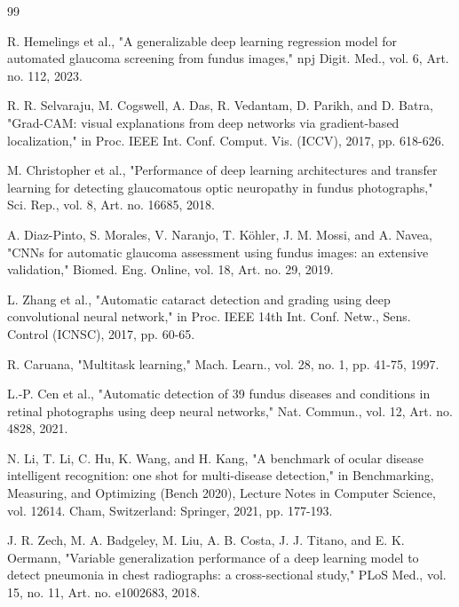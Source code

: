 \documentclass[conference,a4paper]{IEEEtran}
\begin{document}
\begin{thebibliography}{99}

R. Hemelings et al., "A generalizable deep learning regression model for automated glaucoma
screening from fundus images," npj Digit. Med., vol. 6, Art. no. 112, 2023.


R. R. Selvaraju, M. Cogswell, A. Das, R. Vedantam, D. Parikh, and D. Batra, "Grad-CAM: visual
explanations from deep networks via gradient-based localization," in Proc. IEEE Int. Conf. Comput.
Vis. (ICCV), 2017, pp. 618-626.


M. Christopher et al., "Performance of deep learning architectures and transfer learning for
detecting glaucomatous optic neuropathy in fundus photographs," Sci. Rep., vol. 8, Art. no. 16685,
2018.


A. Diaz-Pinto, S. Morales, V. Naranjo, T. Köhler, J. M. Mossi, and A. Navea, "CNNs for automatic
glaucoma assessment using fundus images: an extensive validation," Biomed. Eng. Online, vol. 18,
Art. no. 29, 2019.


L. Zhang et al., "Automatic cataract detection and grading using deep convolutional neural network,"
in Proc. IEEE 14th Int. Conf. Netw., Sens. Control (ICNSC), 2017, pp. 60-65.


R. Caruana, "Multitask learning," Mach. Learn., vol. 28, no. 1, pp. 41-75, 1997.


L.-P. Cen et al., "Automatic detection of 39 fundus diseases and conditions in retinal photographs
using deep neural networks," Nat. Commun., vol. 12, Art. no. 4828, 2021.


N. Li, T. Li, C. Hu, K. Wang, and H. Kang, "A benchmark of ocular disease intelligent recognition:
one shot for multi-disease detection," in Benchmarking, Measuring, and Optimizing (Bench 2020),
Lecture Notes in Computer Science, vol. 12614. Cham, Switzerland: Springer, 2021, pp. 177-193.


J. R. Zech, M. A. Badgeley, M. Liu, A. B. Costa, J. J. Titano, and E. K. Oermann, "Variable
generalization performance of a deep learning model to detect pneumonia in chest radiographs: a
cross-sectional study," PLoS Med., vol. 15, no. 11, Art. no. e1002683, 2018.


\end{thebibliography}
\end{document}
